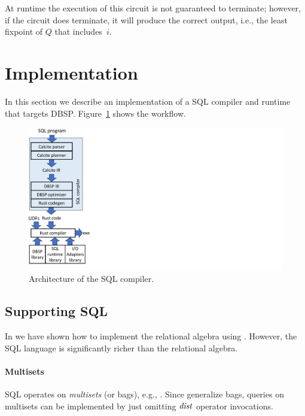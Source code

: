 At runtime the execution of this circuit is not guaranteed to terminate;
however, if the circuit does terminate, it will produce the correct
output, i.e., the least fixpoint of $Q$ that includes~$i$.

\section{Implementation}\label{sec:implementation}

In this section we describe an implementation of a SQL compiler and
runtime that targets DBSP.  Figure~\ref{fig:tools} shows the workflow.

\begin{figure}
  \begin{center}
  \includegraphics[trim={0 0in 7.5in 0},clip,scale=.5]{tools.pdf}
  \caption{\label{fig:tools}Architecture of the SQL compiler.}
  \end{center}
\end{figure}

\subsection{Supporting SQL}

In  we have shown how to implement the
relational algebra using \dbsp.  However, the SQL language is
significantly richer than the relational algebra.

\paragraph{Multisets} SQL operates on \emph{multisets} (or bags), e.g., .
Since \zrs generalize bags, queries on multisets can be implemented by
just omitting $\mathit{dist}$ operator invocations.

